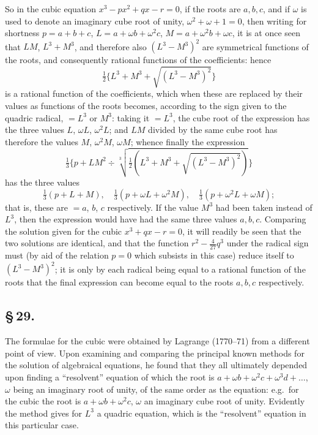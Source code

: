 \documentclass[11pt,a4paper]{book}
\begin{document}
So in the cubic equation $x^{3} - px^{2} + qx - r = 0$, if the roots are $a, b, c$, and if $\omega$ is used to denote an imaginary cube root of unity, $\omega^{2} + \omega + 1 = 0$, then writing for shortness $p = a + b + c$, $L = a + \omega b + \omega^{2}c$, $M = a + \omega^{2}b + \omega c$, it is at once seen that $LM$, $L^{3} + M^{3}$, and therefore also $(L^{3} - M^{3})^{2}$ are symmetrical functions of the roots, and consequently rational functions of the coefficients: hence
\[
\tfrac{1}{2}\{L^{3} + M^{3} + \sqrt{(L^{3} - M^{3})^{2}}\}
\]
is a rational function of the coefficients, which when these are replaced by their values as functions of the roots becomes, according to the sign given to the quadric radical, $= L^{3}$ or $M^{3}$: taking it $= L^{3}$, the cube root of the expression has the three values $L$, $\omega L$, $\omega^{2}L$; and $LM$ divided by the same cube root has therefore the values $M$, $\omega^{2}M$, $\omega M$; whence finally the expression
\[
\tfrac{1}{3}\{p + LM^{2} \div \sqrt[3]{\tfrac{1}{2}(L^{3} + M^{3} + \sqrt{(L^{3} - M^{3})^{2}})}\}
\]
has the three values
\[
\tfrac{1}{3}(p + L + M), \quad \tfrac{1}{3}(p + \omega L + \omega^{2}M), \quad \tfrac{1}{3}(p + \omega^{2}L + \omega M);
\]
that is, these are $= a$, $b$, $c$ respectively. If the value $M^{3}$ had been taken instead of $L^{3}$, then the expression would have had the same three values $a, b, c$. Comparing the solution given for the cubic $x^{3} + qx - r = 0$, it will readily be seen that the two solutions are identical, and that the function $r^{2} - \frac{4}{27}q^{3}$ under the radical sign must (by aid of the relation $p = 0$ which subsists in this case) reduce itself to $(L^{3} - M^{3})^{2}$; it is only by each radical being equal to a rational function of the roots that the final expression can become equal to the roots $a, b, c$ respectively.

\subsection*{\S\,29.}

The formulae for the cubic were obtained by Lagrange (1770--71) from a different point of view. Upon examining and comparing the principal known methods for the solution of algebraical equations, he found that they all ultimately depended upon finding a ``resolvent'' equation of which the root is $a + \omega b + \omega^{2}c + \omega^{3}d + \ldots$, $\omega$ being an imaginary root of unity, of the same order as the equation: e.g.\ for the cubic the root is $a + \omega b + \omega^{2}c$, $\omega$ an imaginary cube root of unity. Evidently the method gives for $L^{3}$ a quadric equation, which is the ``resolvent'' equation in this particular case.
\end{document}

